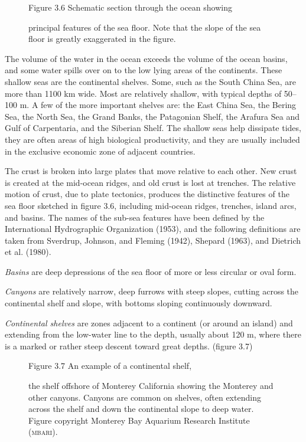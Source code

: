 \begin{figure}[b!]
\centering
\vspace{-2ex}
\footnotesize
Figure 3.6 Schematic section through the ocean showing\rule{0pt}{4ex}
principal features of the sea floor. Note that the slope of the sea
floor is greatly exaggerated in the figure.
\label{fig:bathysketch}
\end{figure}

The volume of the water in the ocean exceeds the volume of the ocean
basins, and some water spills over on to the low lying areas of the
continents. These shallow seas are the continental shelves. Some, such
as the South China Sea, are more than 1100 km wide. Most are
relatively shallow, with typical depths of 50--100 m. A few of the
more important shelves are: the East China Sea, the Bering Sea, the
North Sea, the Grand Banks, the Patagonian Shelf, the Arafura Sea and
Gulf of Carpentaria, and the Siberian Shelf. The shallow seas help
dissipate tides, they are often areas of high biological productivity,
and they are usually included in the exclusive economic zone of
adjacent countries.

The crust is broken into large plates that move relative to each
other. New crust is created at the mid-ocean ridges, and old crust is
lost at trenches. The relative motion of crust, due to plate
tectonics, produces the distinctive features of the sea floor sketched
in figure 3.6, including mid-ocean ridges, trenches, island arcs, and
basins.  The names of the sub-sea features
have been defined by the International Hydrographic
Organization (1953), and the
following definitions are taken from Sverdrup, Johnson, and Fleming
(1942), Shepard (1963), and Dietrich et al. (1980).

\textit{Basins} are deep depressions of the sea
floor of more or less circular or oval form.

\textit{Canyons} are relatively narrow, deep
furrows with steep slopes, cutting across the continental shelf and
slope, with bottoms sloping continuously downward.

\textit{Continental shelves} are
zones adjacent to a continent (or around an island) and extending from
the low-water line to the depth, usually about 120 m, where there is a
marked or rather steep descent toward great depths. (figure 3.7)
\begin{figure}[b!]
\vspace{-2ex}
\footnotesize
Figure 3.7 An example of a continental shelf,\rule{0pt}{3ex} the shelf
offshore of Monterey California showing the Monterey and other
canyons.  Canyons are common on shelves, often extending across the
shelf and down the continental slope to deep water. Figure copyright
Monterey Bay Aquarium Research Institute (\textsc{mbari}).
\label{fig:canyon}
\end{figure}


